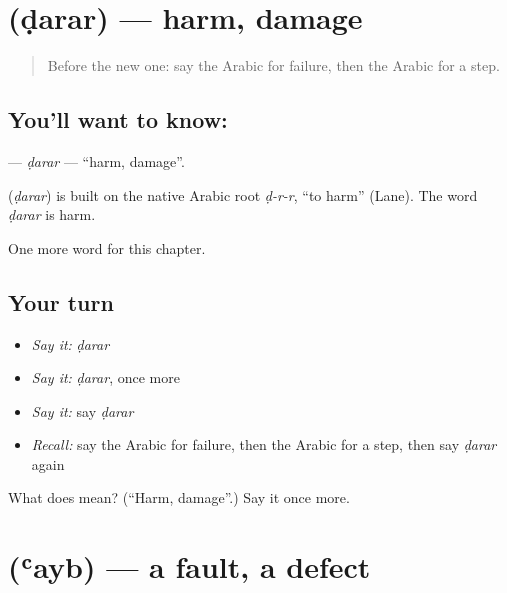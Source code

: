 \section[\texorpdfstring{\ar{ضرر} (ḍarar)}{ضرر (ḍarar)}]{ (ḍarar) — harm, damage}

\label{lesson:AR-C269-darar}



\begin{quote}
Before the new one: say the Arabic for failure, then the Arabic for a step.
\end{quote}

\subsection*{You'll want to know: }
\textbf{} — \emph{ḍarar} — \textquotedblleft{}harm, damage\textquotedblright{}.

\begin{cousinweb}
\textbf{} (\emph{ḍarar}) is built on the native Arabic root \emph{ḍ-r-r}, \textquotedblleft{}to harm\textquotedblright{} (Lane). The word \emph{ḍarar} is harm.
\end{cousinweb}

\begin{grammarlens}[title={What you've built}]
One more word for this chapter.
\end{grammarlens}

\subsection*{Your turn}
\begin{itemize}
\raggedright
  \item \emph{Say it:} \emph{ḍarar}
  \item \emph{Say it:} \emph{ḍarar}, once more
  \item \emph{Say it:} say \emph{ḍarar}
  \item \emph{Recall:} say the Arabic for failure, then the Arabic for a step, then say \emph{ḍarar} again
\end{itemize}

\begin{tcolorbox}[breakable,colback=teal!4,colframe=teal!35!black,title={Before you move on}]
What does  mean? (\textquotedblleft{}Harm, damage\textquotedblright{}.) Say it once more.
\end{tcolorbox}
\section[\texorpdfstring{\ar{عيب} (ʿayb)}{عيب (ʿayb)}]{ (ʿayb) — a fault, a defect}

